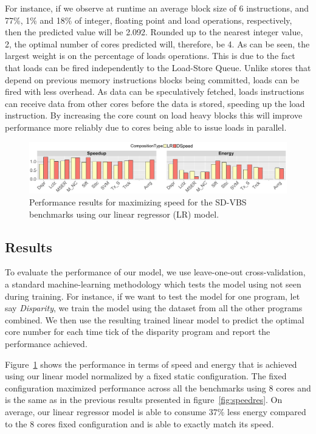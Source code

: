 For instance, if we observe at runtime an average block size of 6 instructions, and 77\%, 1\% and 18\% of integer, floating point and load operations, respectively, then the predicted value will be 2.092.
Rounded up to the nearest integer value, 2, the optimal number of cores predicted will, therefore, be 4.
As can be seen, the largest weight is on the percentage of loads operations.
This is due to the fact that loads can be fired independently to the Load-Store Queue.
Unlike stores that depend on previous memory instructions blocks being committed, loads can be fired with less overhead.
As data can be speculatively fetched, loads instructions can receive data from other cores before the data is stored, speeding up the load instruction.
By increasing the core count on load heavy blocks this will improve performance more reliably due to cores being able to issue loads in parallel.

\begin{figure}[t]
    \centering
	\includegraphics[width=1\textwidth]{cases-paper/graphics/results/lr_speed.pdf}
\vspace*{-8mm}
    \caption{Performance results for maximizing speed for the SD-VBS benchmarks using our linear regressor (LR) model.}%
    \label{fig:speedlr}
\vspace{5mm}
\end{figure}
\subsection{Results}

To evaluate the performance of our model, we use leave-one-out cross-validation, a standard machine-learning methodology which tests the model using not seen during training.
For instance, if we want to test the model for one program, let say \textit{Disparity}, we train the model using the dataset from all the other programs combined.
We then use the resulting trained linear model to predict the optimal core number for each time tick of the disparity program and report the performance achieved.

Figure~\ref{fig:speedlr} shows the performance in terms of speed and energy that is achieved using our linear model normalized by a fixed static configuration.
The fixed configuration maximized performance across all the benchmarks using 8 cores and is the same as in the previous results presented in figure~\ref{fig:speedres}.
On average, our linear regressor model is able to consume 37\% less energy compared to the 8 cores fixed configuration and is able to exactly match its speed.

